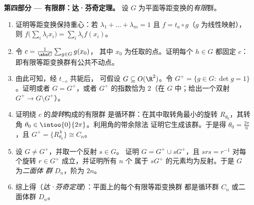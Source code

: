 \begin{problem}
\medskip
\noindent\textbf{第四部分 --- 有限群：达·芬奇定理。}
设 $G$ 为平面等距变换的\emph{有限}群。
\begin{enumerate}[resume]
  \item 证明等距变换保持重心：若
        $\lambda_1 + \dots + \lambda_m = 1$ 且 $f = t_a \circ
        g$（$g$ 为线性映射），则 $f\bigl(\sum_i \lambda_i
        x_i\bigr) = \sum_i \lambda_i f(x_i)$。
  \item 令 $c = \frac{1}{\abs G}\sum_{g \in G} g(x_0)$，
        其中 $x_0$ 为任取的点。证明每个 $h \in G$ 都固定 $c$：
        即有限等距变换群有公共不动点。
  \item 由此可知，经 $t_{-c}$ 共轭后，
        可假设 $G \subseteq O(\R^2)$。令 $G^{+} = \{g \in G :
        \det g = 1\}$。证明或者 $G = G^{+}$，或者 $G^{+}$
        的指数恰为 $2$（在 $G$ 中；给出一个双射 $G^+
        \to G \setminus G^+$）。
  \item 证明绕 $c$ 的\emph{旋转}构成的有限群
        是循环群：在其中取转角最小的旋转
        $R_{\theta_0}$，其转角 $\theta_0 \in
        \intoo{0}{2\pi}$。利用角的带余除法
        证明它生成该群。于是得 $\theta_0 =
        \frac{2\pi}n$，且 $G^{+} = \{R_{\theta_0}^{\,k}\} \cong
        C_n$。
  \item 设 $G \neq G^{+}$，并取一个反射 $s \in G$。
        证明 $G = G^{+} \cup sG^{+}$，且 $s r s = r^{-1}$
        对每个旋转 $r \in G^{+}$ 成立，并证明所有 $n$ 个
        属于 $sG^{+}$ 的元素均为反射。于是 $G$ 为\emph{二面体
        群} $D_n$，阶为 $2n$。
  \item 综上得（\emph{达·芬奇定理}）：平面上的每个有限等距变换群
        都是循环群 $C_n$ 或二面体群
        $D_n$。
\end{enumerate}


\end{problem}
